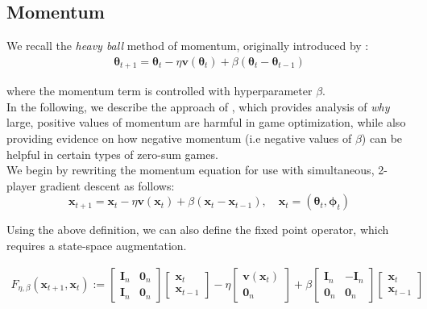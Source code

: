 \documentclass{article}
\renewcommand{\vec}[1]{\ensuremath{\boldsymbol{#1}}}
\begin{document}
\subsection{Momentum}
We recall the \textit{heavy ball} method of momentum, originally introduced by \cite{POLYAK19641}:
\begin{align}
\vec{\theta}_{t+1} = \vec{\theta}_t - \eta\vec{v}(\vec{\theta}_t) + \beta(\vec{\theta}_t - \vec{\theta}_{t-1})
\end{align}

where the momentum term is controlled with hyperparameter $\beta$.
\\

In the following, we describe the approach of \cite{Gidel18NegMom}, which provides analysis of \textit{why} large, positive values of momentum are harmful in game optimization, while also providing evidence on how negative momentum (i.e negative values of $\beta$) can be helpful in certain types of zero-sum games.
\\

We begin by rewriting the momentum equation for use with simultaneous, 2-player gradient descent as follows:
$$\vec{x}_{t+1} = \vec{x}_t - \eta\vec{v}(\vec{x}_t) + \beta(\vec{x}_t - \vec{x}_{t-1}), \quad \vec{x}_t = (\vec{\theta}_t, \vec{\phi}_t)$$

Using the above definition, we can also define the fixed point operator, which requires a state-space augmentation.

\begin{align}
    F_{\eta, \beta}(\vec{x}_{t+1}, \vec{x}_t) := 
    \begin{bmatrix}
        \vec{I}_n & \vec{0}_n \\
        \vec{I}_n & \vec{0}_n
    \end{bmatrix}
    \begin{bmatrix}
        \vec{x}_t \\
        \vec{x}_{t-1}
    \end{bmatrix} 
    - \eta 
    \begin{bmatrix}
        \vec{v}(\vec{x}_t) \\
        \vec{0}_n
    \end{bmatrix} 
    + \beta 
    \begin{bmatrix}
        \vec{I}_n & -\vec{I}_n \\
        \vec{0}_n & \vec{0}_n
    \end{bmatrix}
    \begin{bmatrix}
        \vec{x}_t \\
        \vec{x}_{t-1}
    \end{bmatrix} 
\end{align}
\end{document}
